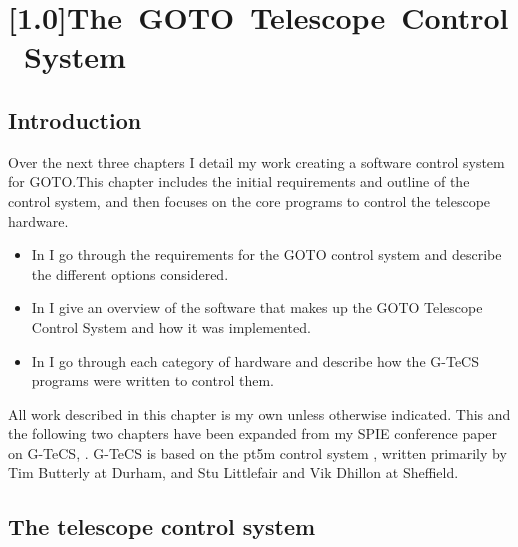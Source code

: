 
\chapter[The GOTO Telescope Control System]{%
    \protect\scalebox{0.96}[1.0]{\mbox{The GOTO Telescope Control System}}
}
\label{chap:gtecs}


\chaptoc{}


\section{Introduction}
\label{sec:gtecs_intro}


\begin{colsection}

Over the next three chapters I detail my work creating a software control system for GOTO.\@ This chapter includes the initial requirements and outline of the control system, and then focuses on the core programs to control the telescope hardware.
%
\begin{itemize}
    \item In  I go through the requirements for the GOTO control system and describe the different options considered.
    \item In  I give an overview of the software that makes up the GOTO Telescope Control System and how it was implemented.
    \item In  I go through each category of hardware and describe how the G-TeCS programs were written to control them.
\end{itemize}
%
All work described in this chapter is my own unless otherwise indicated. This and the following two chapters have been expanded from my SPIE conference paper on G-TeCS, \citet{Dyer}. G-TeCS is based on the pt5m control system \citep{pt5m}, written primarily by Tim Butterly at Durham, and Stu Littlefair and Vik Dhillon at Sheffield.

\newpage

\end{colsection}


\section{The telescope control system}
\label{sec:control_systems}

